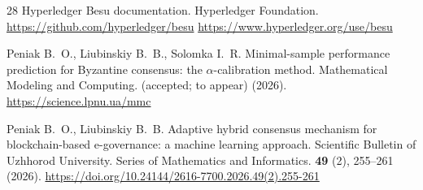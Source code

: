\begin{thebibliography}{28}
Hyperledger Besu documentation. Hyperledger Foundation.
\url{https://github.com/hyperledger/besu}
\url{https://www.hyperledger.org/use/besu}

Peniak B.~O., Liubinskiy B.~B., Solomka I.~R. Minimal-sample performance
prediction for Byzantine consensus: the $\alpha$-calibration method.
Mathematical Modeling and Computing. (accepted; to appear) (2026).
\url{https://science.lpnu.ua/mmc}

Peniak B.~O., Liubinskiy B.~B. Adaptive hybrid consensus mechanism for
blockchain-based \mbox{e-governance}: a machine learning approach. Scientific Bulletin
of Uzhhorod University. Series of Mathematics and Informatics. \textbf{49} (2),
255--261 (2026).
\url{https://doi.org/10.24144/2616-7700.2026.49(2).255-261}

\end{thebibliography}
